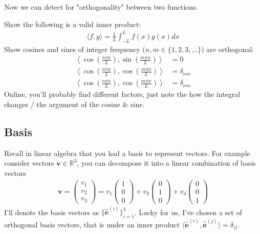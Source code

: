 \documentclass[12pt,fleqn]{article}
\numberwithin{equation}{section} %
\newcounter{problem}
\begin{document}
Now we can detect for "orthogonality" between two functions. 
\begin{problem}
	Show the following is a valid inner product:
	\begin{align}
		\langle f, g \rangle = \frac{1}{L} \int_{-L}^L f(x) g(x) dx
	\end{align}
	Show cosines and sines of integer frequency ($n,m \in \{1, 2, 3, ...\}$) are orthogonal:
	\begin{align}
		\left \langle \cos\left(\frac{n \pi x}{L}\right), \sin\left(\frac{m \pi x}{L} \right) \right\rangle & = 0 \\
		\left \langle \cos\left(\frac{n \pi x}{L}\right), \cos\left(\frac{m \pi x}{L} \right) \right\rangle & =   \delta_{nm} \\
		\left \langle \cos\left(\frac{n \pi x}{L}\right), \cos\left(\frac{m \pi x}{L} \right) \right\rangle  & =  \delta_{nm}
	\end{align}
	Online, you'll probably find different factors, just note the how the integral changes / the argument of the cosine \& sine.
\end{problem}

\subsection{Basis}
Recall in linear algebra that you had a basis to represent vectors. For example consider vectors $\mathbf v \in \mathbb R^3$, you can decompose it into a linear combination of basis vectors
\begin{align}
	\mathbf v = \begin{pmatrix}
		v_1 \\ v_2 \\ v_3 
	\end{pmatrix} = v_1 \begin{pmatrix}
		1 \\ 0 \\ 0
	\end{pmatrix} + v_2 \begin{pmatrix}
		0 \\ 1\\ 0
 	\end{pmatrix} + v_3 \begin{pmatrix}
 		0 \\ 0 \\ 1
 	\end{pmatrix}
\end{align}I'll denote the basis vectors as $\{\mathbf{\hat e}^{(i)}\}_{i=1}^3$. Lucky for us, I've chosen a set of orthogonal basis vectors, that is under an inner product $\langle \mathbf{\hat e}^{(i)}, \mathbf{\hat e}^{(j)} \rangle = \delta_{ij}$.
\end{document}

